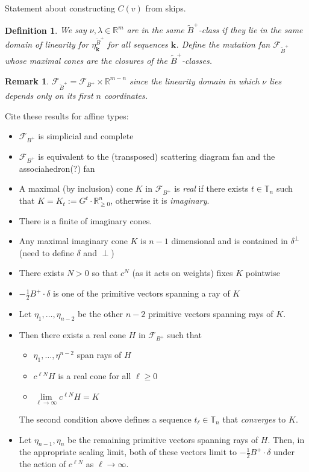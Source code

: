 \documentclass{amsart}
\newtheorem{definition}[theorem]{Definition}
\newtheorem{remark}[theorem]{Remark}
\numberwithin{theorem}{section}
\newcommand{\bfk}{{\boldsymbol{k}}}
\newcommand{\cF}{\mathcal{F}}
\newcommand{\RR}{\mathbb{R}}
\newcommand{\TT}{\mathbb{T}}
\begin{document}
  Statement about constructing $C(v)$ from skips.

  
  







  \begin{definition}
    We say $\nu,\lambda\in\RR^m$ are in the same \emph{$\widetilde B^+$-class} if they lie in the same domain of linearity for $\eta^{\widetilde B^+}_\bfk$ for all sequences $\bfk$.
    Define the \emph{mutation fan} $\cF_{\widetilde B^+}$ whose maximal cones are the closures of the $\widetilde B^+$-classes.
  \end{definition}
  \begin{remark}
    $\cF_{\widetilde B^+}=\cF_{B^+}\times \RR^{m-n}$ since the linearity domain in which $\nu$ lies depends only on its first $n$ coordinates.
  \end{remark}

  Cite these results for affine types:
  \begin{itemize}
    \item $\cF_{B^+}$ is simplicial and complete 
    \item $\cF_{B^+}$ is equivalent to the (transposed) scattering diagram fan and the associahedron(?) fan
    \item A maximal (by inclusion) cone $K$ in $\cF_{B^+}$ is \emph{real} if there exists $t\in\TT_n$ such that $K=K_t:=G^t\cdot\RR^n_{\ge0}$, otherwise it is \emph{imaginary}.
    \item There is a finite of imaginary cones.
    \item Any maximal imaginary cone $K$ is $n-1$ dimensional and is contained in $\delta^\perp$ (need to define $\delta$ and $\perp$)
    \item There exists $N>0$ so that $c^N$ (as it acts on weights) fixes $K$ pointwise
    \item $-\frac12 B^+\cdot\delta$ is one of the primitive vectors spanning a ray of $K$
    \item Let $\eta_1,\ldots,\eta_{n-2}$ be the other $n-2$ primitive vectors spanning rays of $K$.  
    \item Then there exists a real cone $H$ in $\cF_{B^+}$ such that
      \begin{itemize}
        \item $\eta_1,\ldots,\eta^{n-2}$ span rays of $H$
        \item $c^{\ell N} H$ is a real cone for all $\ell\ge0$
        \item $\lim\limits_{\ell\to\infty} c^{\ell N} H = K$
      \end{itemize}
      The second condition above defines a sequence $t_\ell\in\TT_n$ that \emph{converges} to $K$.
    \item Let $\eta_{n-1},\eta_n$ be the remaining primitive vectors spanning rays of $H$.  Then, in the appropriate scaling limit, both of these vectors limit to $-\frac12 B^+\cdot\delta$ under the action of $c^{\ell N}$ as $\ell\to\infty$.
  \end{itemize}
\end{document}
